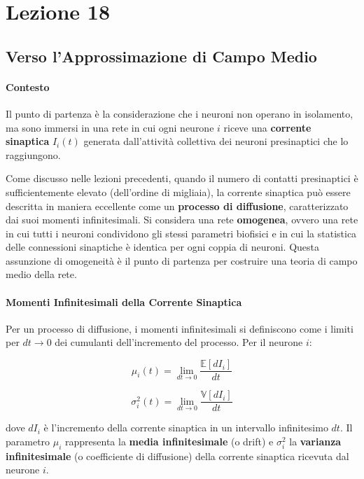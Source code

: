 \chapter{Lezione 18}



\section{Verso l’Approssimazione di Campo Medio}

\subsubsection{Contesto}
Il punto di partenza è la considerazione che i neuroni non operano in isolamento, ma sono immersi in una rete in cui ogni neurone $i$ riceve una \textbf{corrente sinaptica} $I_i(t)$ generata dall'attività collettiva dei neuroni presinaptici che lo raggiungono.

Come discusso nelle lezioni precedenti, quando il numero di contatti presinaptici è sufficientemente elevato (dell'ordine di migliaia), la corrente sinaptica può essere descritta in maniera eccellente come un \textbf{processo di diffusione}, caratterizzato dai suoi momenti infinitesimali. Si considera una rete \textbf{omogenea}, ovvero una rete in cui tutti i neuroni condividono gli stessi parametri biofisici e in cui la statistica delle connessioni sinaptiche è identica per ogni coppia di neuroni. Questa assunzione di omogeneità è il punto di partenza per costruire una teoria di campo medio della rete.

\subsubsection{Momenti Infinitesimali della Corrente Sinaptica}
Per un processo di diffusione, i momenti infinitesimali si definiscono come i limiti per $dt \to 0$ dei cumulanti dell'incremento del processo. Per il neurone $i$:

\begin{equation}
\mu_i(t) = \lim_{dt \to 0} \frac{\mathbb{E}[dI_i]}{dt}
\end{equation}

\begin{equation}
\sigma_i^2(t) = \lim_{dt \to 0} \frac{\mathbb{V}[dI_i]}{dt}
\end{equation}

dove $dI_i$ è l'incremento della corrente sinaptica in un intervallo infinitesimo $dt$. Il parametro $\mu_i$ rappresenta la \textbf{media infinitesimale} (o drift) e $\sigma_i^2$ la \textbf{varianza infinitesimale} (o coefficiente di diffusione) della corrente sinaptica ricevuta dal neurone $i$.

